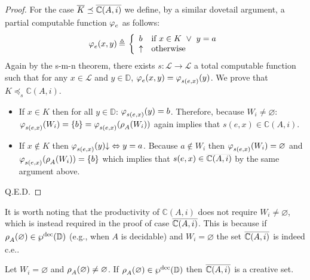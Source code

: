 \documentclass[runningheads]{llncs}
\def\ok#1{\mbox{\raisebox{0ex}[1ex][1ex]{$#1$}}}
\def\re{c.e.}
\newcommand{\myqed}{\textsc{Q.E.D.}}
\def\wprec{\wp^{\text{dec}}}
\def\bbbc{{\mathbb{C}}}
\newcommand{\ccL}{\mathscr{L}}
\newcommand{\Domain}{\mathbb{D}}
\newcommand{\pfunction}[3]{\ok{\varphi^{#2\, #3}_{#1}}}
\newcommand{\auco}[2]{\ok{\rho^{#1}_{#2}}}
\newcommand{\compl}[1]{\ok{\overline{#1}}}
\newcommand{\ud}{\ok{\:\triangleq\:}}
\def\ok#1{\mbox{\raisebox{0ex}[1ex][1ex]{$#1$}}}
\def\cAA{\ensuremath{A}}
\begin{document}
\begin{proof}
    For the case $\compl{K}\preceq \compl{\bbbc(\cAA,i)}$ we define, by a similar dovetail argument, a partial computable function $\pfunction{e}{}{}$ as follows:
    $$\pfunction{e}{}{}(x,y)\ud \left\{
    \begin{array}{ll}
       b & \mbox{if  $x\in K~\vee~y=a$}\\
       \uparrow &\mbox{otherwise}
    \end{array}
    \right .
    $$
    Again by the s-m-n theorem, there exists $s:\ccL\rightarrow\ccL$ a total computable function such that for any $x\in\ccL$ and $y\in\Domain$, 
    $\pfunction{e}{}{}(x,y)=\pfunction{s(e,x)}{}{}(y)$. We prove that $K\preceq_{s}\bbbc(\cAA,i)$. 
    \begin{itemize}
        \item 
        If $x\in K$ then 
        for all $y\in\Domain$:
        $\pfunction{s(e,x)}{}{}(y)=b$. Therefore, because $W_i\neq\varnothing$: $\pfunction{s(e,x)}{}{}(W_i)=\{b\}=\pfunction{s(e,x)}{}{}(\auco{}{A}(W_i))$ again implies that $s(e,x)\in \bbbc(\cAA,i)$.\\
        \item 
        If $x\not\in K$ then $\pfunction{s(e,x)}{}{}(y){\downarrow}\Leftrightarrow y=a$. Because $a\not\in W_i$ then $\pfunction{s(e,x)}{}{}(W_i)=\varnothing$ and $\ok{\pfunction{s(e,x)}{}{}(\auco{}{A}(W_i))=\{b\}}$ which implies that $s(e,x)\in \compl{\bbbc(\cAA,i)}$ by the same argument above.
    \end{itemize} \myqed
\end{proof}
It is worth noting that the productivity of $\bbbc(\cAA,i)$ does not require $W_i\neq\varnothing$, which is instead required in the proof of case $\ok{\compl{\bbbc(\cAA,i)}}$. This is because if $\auco{}{A}(\varnothing)\in\wprec(\Domain)$ (e.g., when $\cAA$ is decidable) and $W_i=\varnothing$ the set $\ok{\compl{\bbbc(\cAA,i)}}$ is indeed {\re}. 

\begin{proposition}
    Let $W_i=\varnothing$ and $\auco{}{A}(\varnothing)\neq\varnothing$. If $\auco{}{A}(\varnothing)\in\wprec(\Domain)$ then $\compl{\bbbc(\cAA,i)}$ is a creative set.
\end{proposition}
\end{document}
